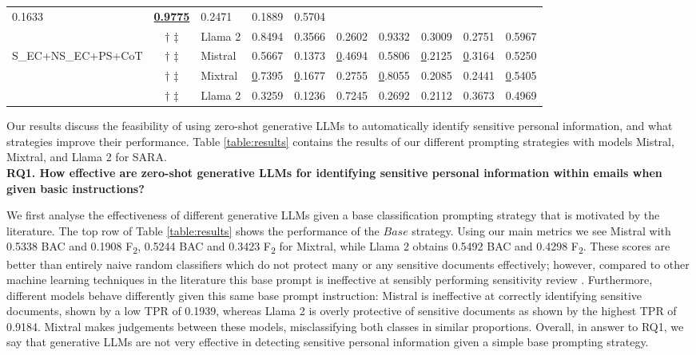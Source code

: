 \begin{table*}[!h]
\begin{tabular}{@{}lclccccccc@{}}
  0.1633 &
  {\ul \textbf{0.9775}} &
  0.2471 &
  0.1889 &
  0.5704 \\
 &
  $\dagger$ $\ddagger$ &
  Llama 2 &
  0.8494 &
  0.3566 &
  0.2602 &
  0.9332 &
  0.3009 &
  0.2751 &
  0.5967 \\ \cmidrule(l){3-10}
\multirow{3}{*}{S\_EC+NS\_EC+PS+CoT} &
  $\dagger$ $\ddagger$ &
  Mistral &
  0.5667 &
  0.1373 &
  {\ul 0.4694} &
  0.5806 &
  {\ul 0.2125} &
  {\ul 0.3164} &
  0.5250 \\
 &
  $\dagger$ $\ddagger$ &
  Mixtral &
  {\ul 0.7395} &
  {\ul 0.1677} &
  0.2755 &
  {\ul 0.8055} &
  0.2085 &
  0.2441 &
  {\ul 0.5405} \\
 &
  $\dagger$ $\ddagger$ &
  Llama 2 &
  0.3259 &
  0.1236 &
  0.7245 &
  0.2692 &
  0.2112 &
  0.3673 &
  0.4969 \\ \cmidrule(l){1-10} 
\end{tabular}
\end{table*}

Our results discuss the feasibility of using zero-shot generative LLMs to automatically identify sensitive personal information, and what strategies improve their performance. Table \ref{table:results} contains the results of our different prompting strategies with models Mistral, Mixtral, and Llama 2 for SARA. \\

\textbf{RQ1. How effective are zero-shot generative LLMs for identifying sensitive personal information within emails when given basic instructions?}

We first analyse the effectiveness of different generative LLMs given a base classification prompting strategy that is motivated by the literature. The top row of Table \ref{table:results} shows the performance of the $Base$ strategy. Using our main metrics we see Mistral with 0.5338 BAC and 0.1908 F\textsubscript{2}, 0.5244 BAC and 0.3423 F\textsubscript{2} for Mixtral, while Llama 2 obtains 0.5492 BAC and 0.4298 F\textsubscript{2}. These scores are better than entirely naive random classifiers which do not protect many or any sensitive documents effectively; however, compared to other machine learning techniques in the literature this base prompt is ineffective at sensibly performing sensitivity review \cite{mckechnie2024sara}. Furthermore, different models behave differently given this same base prompt instruction: Mistral is ineffective at correctly identifying sensitive documents, shown by a low TPR of 0.1939, whereas Llama 2 is overly protective of sensitive documents as shown by the highest TPR of 0.9184. Mixtral makes judgements between these models, misclassifying both classes in similar proportions. Overall, in answer to RQ1, we say that generative LLMs are not very effective in detecting sensitive personal information given a simple base prompting strategy. \\

